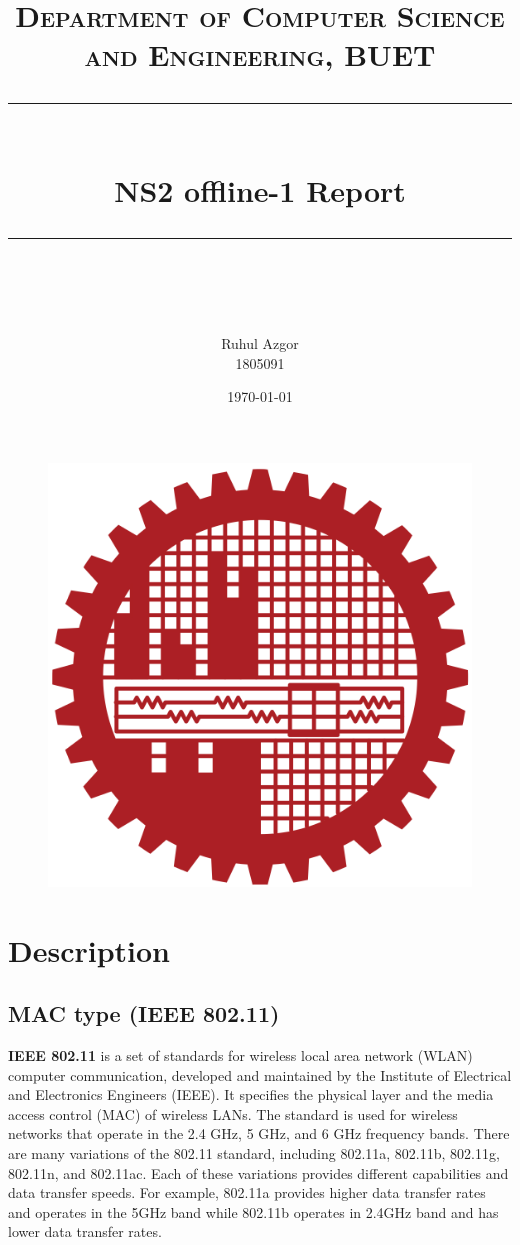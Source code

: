 \documentclass[14pt]{scrartcl} %
\title{	
	\normalfont\normalsize
	\textsc{Department of Computer Science and Engineering, BUET}\\ %
	\vspace{25pt} %
	\rule{\linewidth}{0.5pt}\\ %
	\vspace{20pt} %
	{\huge NS2 offline-1 Report}\\ %
	\vspace{12pt} %
	\rule{\linewidth}{2pt}\\ %
	\vspace{12pt} %
}
\author{\LARGE Ruhul Azgor \\ 1805091} %
\date{\normalsize\today} %
\begin{document}
\maketitle %


\section*{}

\begin{figure}[h] %
	\centering
	\includegraphics[width=0.5\columnwidth]{Figures/BUET_LOGO.svg.png} %
	 
\end{figure}

\pagebreak
\section{Description}
\subsection{MAC type (IEEE 802.11) }
\textbf{IEEE 802.11} is a set of standards for wireless local area network (WLAN) computer communication, developed and maintained by the Institute of Electrical and Electronics Engineers (IEEE). It specifies the physical layer and the media access control (MAC) of wireless LANs. The standard is used for wireless networks that operate in the 2.4 GHz, 5 GHz, and 6 GHz frequency bands. There are many variations of the 802.11 standard, including 802.11a, 802.11b, 802.11g, 802.11n, and 802.11ac. Each of these variations provides different capabilities and data transfer speeds. For example, 802.11a provides higher data transfer rates and operates in the 5GHz band while 802.11b operates in 2.4GHz band and has lower data transfer rates.
\end{document}
